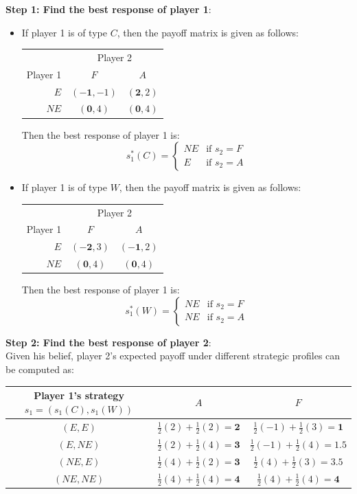 \documentclass[twoside]{article}
\theoremstyle{definitionstyle}
\begin{document}
\textbf{Step 1: Find the best response of player 1}:\\
\begin{itemize}
    \item If player 1 is of type $C$, then the payoff matrix is given as follows:
    \begin{center}
    \begin{tabular}{r|cc}
        \multicolumn{1}{c}{} & \multicolumn{2}{c}{Player 2} \\
        Player 1 & $F$ & $A$ \\ \hline
        $E$ & $(-\mathbf{1}, -1)$ & $(\mathbf{2}, 2)$ \\
        $NE$ & $(\mathbf{0}, 4)$ & $(\mathbf{0}, 4)$
    \end{tabular}
    \end{center}
    Then the best response of player 1 is:
    $$s_1^*(C) = \begin{cases} 
    NE & \text{if } s_2 = F \\ 
    E & \text{if } s_2 = A 
    \end{cases}$$

    \item If player 1 is of type $W$, then the payoff matrix is given as follows:
    \begin{center}
    \begin{tabular}{r|cc}
        \multicolumn{1}{c}{} & \multicolumn{2}{c}{Player 2} \\
        Player 1 & $F$ & $A$ \\ \hline
        $E$ & $(-\mathbf{2}, 3)$ & $(-\mathbf{1}, 2)$ \\
        $NE$ & $(\mathbf{0}, 4)$ & $(\mathbf{0}, 4)$
    \end{tabular}
    \end{center}
    Then the best response of player 1 is:
    $$s_1^*(W) = \begin{cases} 
    NE & \text{if } s_2 = F \\ 
    NE & \text{if } s_2 = A 
    \end{cases}$$
\end{itemize}
\textbf{Step 2: Find the best response of player 2}:\\
Given his belief, player 2's expected payoff under different strategic profiles can be computed as:

\begin{center}
\begin{tabular}{c|cc}
    Player 1's strategy $s_1 = (s_1(C), s_1(W))$ & $A$ & $F$ \\ \hline
    $(E, E)$ & $\frac{1}{2}(2) + \frac{1}{2}(2) = \mathbf{2}$ & $\frac{1}{2}(-1) + \frac{1}{2}(3) = \mathbf{1}$ \\
    $(E, NE)$ & $\frac{1}{2}(2) + \frac{1}{2}(4) = \mathbf{3}$ & $\frac{1}{2}(-1) + \frac{1}{2}(4) = \mathbf{1.5}$ \\
    $(NE, E)$ & $\frac{1}{2}(4) + \frac{1}{2}(2) = \mathbf{3}$ & $\frac{1}{2}(4) + \frac{1}{2}(3) = \mathbf{3.5}$ \\
    $(NE, NE)$ & $\frac{1}{2}(4) + \frac{1}{2}(4) = \mathbf{4}$ & $\frac{1}{2}(4) + \frac{1}{2}(4) = \mathbf{4}$
\end{tabular}
\end{center}
\end{document}
